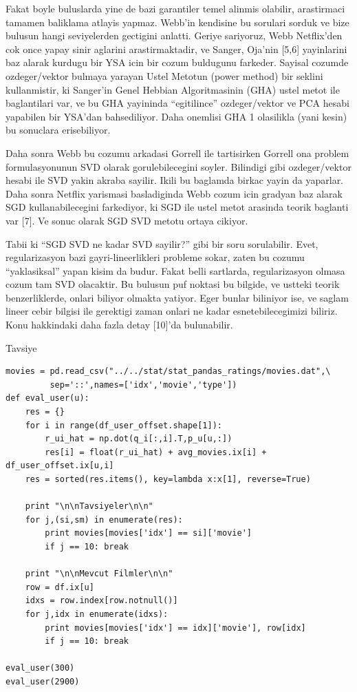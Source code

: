 \documentclass[12pt,fleqn]{article}\usepackage{../common}
\begin{document}
Fakat boyle buluslarda yine de bazi garantiler temel alinmis olabilir,
arastirmaci tamamen baliklama atlayis yapmaz. Webb'in kendisine bu sorulari
sorduk ve bize bulusun hangi seviyelerden gectigini anlatti. Geriye
sariyoruz, Webb Netflix'den cok once yapay sinir aglarini arastirmaktadir,
ve Sanger, Oja'nin [5,6] yayinlarini baz alarak kurdugu bir YSA icin bir
cozum buldugunu farkeder. Sayisal cozumde ozdeger/vektor bulmaya yarayan
Ustel Metotun (power method) bir seklini kullanmistir, ki Sanger'in Genel
Hebbian Algoritmasinin (GHA) ustel metot ile baglantilari var, ve bu GHA
yayininda ``egitilince'' ozdeger/vektor ve PCA hesabi yapabilen bir YSA'dan
bahsediliyor. Daha onemlisi GHA 1 olasilikla (yani kesin) bu sonuclara
erisebiliyor.

Daha sonra Webb bu cozumu arkadasi Gorrell ile tartisirken Gorrell ona
problem formulasyonunun SVD olarak gorulebilecegini soyler. Bilindigi gibi
ozdeger/vektor hesabi ile SVD yakin akraba sayilir. Ikili bu baglamda
birkac yayin da yaparlar. Daha sonra Netflix yarismasi basladiginda Webb
cozum icin gradyan baz alarak SGD kullanabilecegini farkediyor, ki SGD ile
ustel metot arasinda teorik baglanti var [7]. Ve sonuc olarak SGD SVD
metotu ortaya cikiyor.

Tabii ki ``SGD SVD ne kadar SVD sayilir?'' gibi bir soru sorulabilir. Evet,
regularizasyon bazi gayri-lineerlikleri probleme sokar, zaten bu cozumu
``yaklasiksal'' yapan kisim da budur. Fakat belli sartlarda, regularizasyon
olmasa cozum tam SVD olacaktir. Bu bulusun puf noktasi bu bilgide, ve
ustteki teorik benzerliklerde, onlari biliyor olmakta yatiyor. Eger bunlar
biliniyor ise, ve saglam lineer cebir bilgisi ile gerektigi zaman onlari ne
kadar esnetebilecegimizi biliriz. Konu hakkindaki daha fazla detay [10]'da
bulunabilir.

Tavsiye

\begin{verbatim}
movies = pd.read_csv("../../stat/stat_pandas_ratings/movies.dat",\
         sep='::',names=['idx','movie','type'])
def eval_user(u):
    res = {}
    for i in range(df_user_offset.shape[1]):
        r_ui_hat = np.dot(q_i[:,i].T,p_u[u,:])
        res[i] = float(r_ui_hat) + avg_movies.ix[i] + df_user_offset.ix[u,i]
    res = sorted(res.items(), key=lambda x:x[1], reverse=True)

    print "\n\nTavsiyeler\n\n"
    for j,(si,sm) in enumerate(res):
        print movies[movies['idx'] == si]['movie']
        if j == 10: break

    print "\n\nMevcut Filmler\n\n"
    row = df.ix[u]
    idxs = row.index[row.notnull()]
    for j,idx in enumerate(idxs):
        print movies[movies['idx'] == idx]['movie'], row[idx]
        if j == 10: break

eval_user(300)
eval_user(2900)
\end{verbatim}
\end{document}
